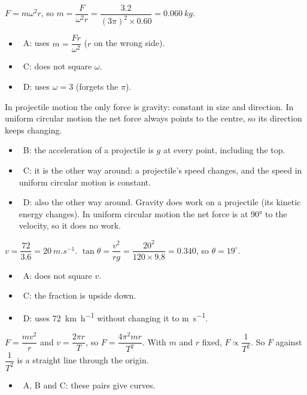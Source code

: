 \documentclass[12pt]{article}
\begin{document}
\begin{practiceanswers}
\begin{practiceans}
  $F = m\omega^2 r$, so $m = \dfrac{F}{\omega^2 r} = \dfrac{3.2}{(3\pi)^2 \times 0.60} = \qty{0.060}{kg}$.
  \begin{itemize}
    \item \xmark\ A: uses $m = \dfrac{Fr}{\omega^2}$ ($r$ on the wrong side).
    \item \xmark\ C: does not square $\omega$.
    \item \xmark\ D: uses $\omega = 3$ (forgets the $\pi$).
  \end{itemize}
\end{practiceans}

\begin{practiceans}
  In projectile motion the only force is gravity: constant in size and direction. In uniform
  circular motion the net force always points to the centre, so its direction keeps changing.
  \begin{itemize}
    \item \xmark\ B: the acceleration of a projectile is $g$ at every point, including the top.
    \item \xmark\ C: it is the other way around: a projectile's speed changes, and the speed in
          uniform circular motion is constant.
    \item \xmark\ D: also the other way around. Gravity does work on a projectile (its kinetic energy
          changes). In uniform circular motion the net force is at \ang{90} to the velocity, so it
          does no work.
  \end{itemize}
\end{practiceans}

\begin{practiceans}
  $v = \dfrac{72}{3.6} = \qty{20}{m.s^{-1}}$. $\tan\theta = \dfrac{v^2}{rg} = \dfrac{20^2}{120 \times
  9.8} = 0.340$, so $\theta = 19^\circ$.
  \begin{itemize}
    \item \xmark\ A: does not square $v$.
    \item \xmark\ C: the fraction is upside down.
    \item \xmark\ D: uses \qty{72}{km.h^{-1}} without changing it to \si{m.s^{-1}}.
  \end{itemize}
\end{practiceans}

\begin{practiceans}
  $F = \dfrac{mv^2}{r}$ and $v = \dfrac{2\pi r}{T}$, so $F = \dfrac{4\pi^2 mr}{T^2}$. With $m$ and
  $r$ fixed, $F \propto \dfrac{1}{T^2}$. So $F$ against $\dfrac{1}{T^2}$ is a straight line through
  the origin.
  \begin{itemize}
    \item \xmark\ A, B and C: these pairs give curves.
  \end{itemize}
\end{practiceans}


\end{practiceanswers}
\end{document}
